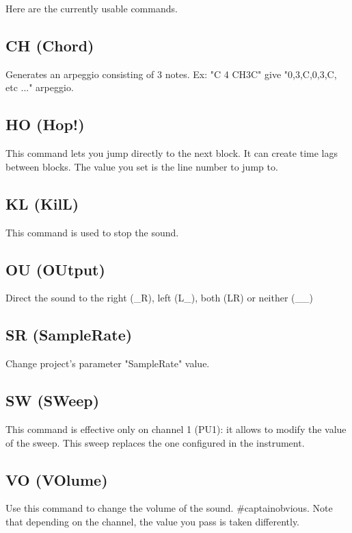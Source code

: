 
Here are the currently usable commands.

\subsection{CH (Chord)}

Generates an arpeggio consisting of 3 notes. Ex: "C 4 CH3C" give "0,3,C,0,3,C, etc ..." arpeggio.

\subsection{HO (Hop!)}

This command lets you jump directly to the next block.
It can create time lags between blocks.
The value you set is the line number to jump to.

\subsection{KL (KilL)}

This command is used to stop the sound.


\subsection{OU (OUtput)}

Direct the sound to the right (\_R), left (L\_), both (LR) or neither (\_\_)

\subsection{SR (SampleRate)}

Change project's parameter "SampleRate" value.

\subsection{SW (SWeep)}

This command is effective only on channel 1 (PU1): it allows to modify the value of the sweep.
This sweep replaces the one configured in the instrument.

\subsection{VO (VOlume)}

Use this command to change the volume of the sound.
\#captainobvious.
Note that depending on the channel, the value you pass is taken differently.
